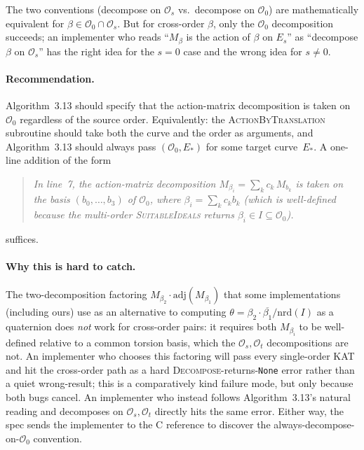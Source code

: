\documentclass[a4paper,11pt]{article}
\newcommand{\algo}[1]{Algorithm~#1}
\begin{document}
The two conventions
(decompose on $\mathcal{O}_s$ vs.\ decompose on $\mathcal{O}_0$)
are mathematically equivalent for $\beta \in
\mathcal{O}_0 \cap \mathcal{O}_s$.  But for cross-order
$\beta$, only the $\mathcal{O}_0$ decomposition succeeds; an
implementer who reads ``$M_\beta$ is the action of $\beta$ on
$E_s$'' as ``decompose $\beta$ on $\mathcal{O}_s$'' has the
right idea for the $s = 0$ case and the wrong idea for $s \neq 0$.

\paragraph{Recommendation.}
\algo{3.13} should specify that the action-matrix decomposition
is taken on $\mathcal{O}_0$ regardless of the source order.
Equivalently: the \textsc{ActionByTranslation} subroutine should
take both the curve and the order as arguments, and \algo{3.13}
should always pass $(\mathcal{O}_0, E_*)$ for some target
curve~$E_*$.  A one-line addition of the form
\begin{quote}\itshape
  In line~7, the action-matrix decomposition
  $M_{\beta_i} = \sum_k c_k\, M_{b_k}$ is taken on the basis
  $(b_0, \ldots, b_3)$ of $\mathcal{O}_0$, where $\beta_i =
  \sum_k c_k b_k$ (which is well-defined because the
  multi-order \textsc{SuitableIdeals} returns $\beta_i \in I
  \subseteq \mathcal{O}_0$).
\end{quote}
suffices.

\paragraph{Why this is hard to catch.}
The two-decomposition factoring
$M_{\beta_2} \cdot \mathrm{adj}(M_{\beta_1})$ that some
implementations (including ours) use as an alternative to
computing $\theta = \beta_2 \cdot \overline{\beta_1} /
\mathrm{nrd}(I)$ as a quaternion does \emph{not} work for
cross-order pairs: it requires both $M_{\beta_i}$ to be
well-defined relative to a common torsion basis, which the
$\mathcal{O}_s, \mathcal{O}_t$ decompositions are not.  An
implementer who chooses this factoring will pass every
single-order KAT and hit the cross-order path as a hard
\textsc{Decompose}-returns-\texttt{None} error rather than a
quiet wrong-result; this is a comparatively kind failure mode,
but only because both bugs cancel.  An implementer who instead
follows \algo{3.13}'s natural reading and decomposes on
$\mathcal{O}_s, \mathcal{O}_t$ directly hits the same error.
Either way, the spec sends the implementer to the C reference
to discover the always-decompose-on-$\mathcal{O}_0$ convention.
\end{document}
